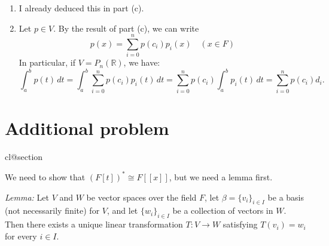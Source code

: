\documentclass[12pt]{article}
\makeatletter
\def\nullstepcounter#1{%
	\begingroup
		\let\@elt\@stpelt
		\csname cl@#1\endcsname
	\endgroup}
\makeatother
\begin{document}
\begin{enumerate}
\begin{enumerate}
\item
I already deduced this in part (c).

\item
Let $p \in V$. By the result of part (c), we can write
\begin{equation*}
p(x) = \sum_{i=0}^n p(c_i) p_i(x) \quad (x \in F)
\end{equation*}
In particular, if $V = P_n(\mathbb{R})$, we have:
\begin{equation*}
\int_a^b p(t) \, dt = \int_a^b \sum_{i=0}^n p(c_i) p_i(t) \, dt = \sum_{i=0}^n p(c_i) \int_a^b p_i(t) \, dt = \sum_{i=0}^n p(c_i) d_i.
\end{equation*}

\end{enumerate}

\end{enumerate}

\section*{Additional problem}
\nullstepcounter{section}

We need to show that $(F[t])^\ast \cong F[[x]]$, but we need a lemma first.

\bigskip
{\it Lemma:} Let $V$ and $W$ be vector spaces over the field $F$, let $\beta = \{v_i\}_{i \in I}$ be a basis (not necessarily finite) for $V$, and let $\{w_i\}_{i \in I}$ be a collection of vectors in $W$. Then there exists a unique linear transformation $T : V \to W$ satisfying $T(v_i) = w_i$ for every $i \in I$.
\end{document}
